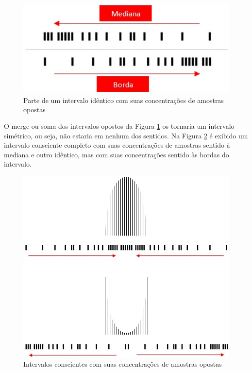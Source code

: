 \begin{figure}[H]
\caption{Parte de um intervalo idêntico com suas concentrações de amostras opostas}
\label{fig:consciousness_concentration_of_opposite_samples}
\centering
\includegraphics[scale=.8]{sections/images/consciousness_concentration_of_opposite_samples.jpg}
\end{figure}

O merge ou soma dos intervalos opostos da Figura \ref{fig:consciousness_concentration_of_opposite_samples} os tornaria um intervalo simétrico, ou seja, não estaria em nenhum dos sentidos.
Na Figura \ref{fig:consciousness_concentration_of_opposite_samples_within_range} é exibido um intervalo consciente completo com suas concentrações de amostras sentido à mediana e outro idêntico, mas com suas concentrações sentido às bordas do intervalo.

\begin{figure}[H]
\caption{Intervalos conscientes com suas concentrações de amostras opostas}
\label{fig:consciousness_concentration_of_opposite_samples_within_range}
\centering
\includegraphics[scale=.8]{sections/images/consciousness_concentration_of_opposite_samples_within_range.jpg}
\end{figure}

